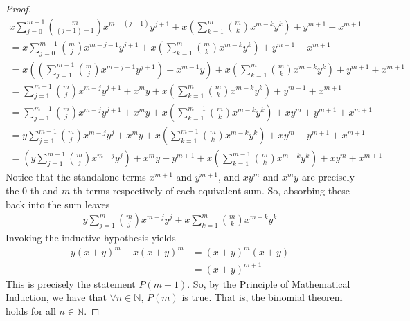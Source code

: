 \documentclass[11pt,reqno, tikz, border=3mm]{amsart}
\theoremstyle{plain}
\theoremstyle{definition}
\theoremstyle{remark}
\begin{document}
\begin{proof}
\begin{align}
x\sum^{m-1}_{j=0}\binom{m}{(j+1)-1}x^{m-(j+1)}y^{j+1} + x\left(\sum^m_{k=1}\binom{m}{k}x^{m-k}y^k\right) + y^{m+1} + x^{m+1} \\
=x\sum^{m-1}_{j=0}\binom{m}{j}x^{m-j-1}y^{j+1} + x\left(\sum^m_{k=1}\binom{m}{k}x^{m-k}y^k\right) + y^{m+1} + x^{m+1} \\
=x\left(\left( \sum^{m-1}_{j=1}\binom{m}{j}x^{m-j-1}y^{j+1}\right) + x^{m-1} y\right) + x\left(\sum^m_{k=1}\binom{m}{k}x^{m-k}y^k\right) + y^{m+1} + x^{m+1} \\
=\sum^{m-1}_{j=1} \binom{m}{j} x^{m-j}y^{j+1} + x^my + x\left(\sum^m_{k=1}\binom{m}{k}x^{m-k}y^k\right) + y^{m+1} + x^{m+1} \\
=\sum^{m-1}_{j=1} \binom{m}{j} x^{m-j}y^{j+1} + x^my + x\left(\sum^{m-1}_{k=1}\binom{m}{k}x^{m-k}y^k\right)+xy^m+y^{m+1}+x^{m+1} \\
=y\sum^{m-1}_{j=1} \binom{m}{j} x^{m-j}y^{j} + x^my + x\left(\sum^{m-1}_{k=1}\binom{m}{k}x^{m-k}y^k\right)+xy^m+y^{m+1}+x^{m+1} \\
=\left(y\sum^{m-1}_{j=1} \binom{m}{j} x^{m-j}y^{j}\right) + x^my + y^{m+1} + x\left(\sum^{m-1}_{k=1}\binom{m}{k}x^{m-k}y^k\right)+xy^m+x^{m+1}
\end{align}
Notice that the standalone terms $x^{m+1}$ and $y^{m+1}$, and $xy^m$ and $x^my$ are precisely the $0$-th and $m$-th terms respectively of each equivalent sum. So, absorbing these back into the sum leaves
\begin{align}
y\sum^m_{j=1} \binom{m}{j}x^{m-j}y^j + x\sum^{m}_{k=1}\binom{m}{k}x^{m-k}y^k
\end{align}
Invoking the inductive hypothesis yields
\begin{align}
y(x+y)^m + x(x+y)^m &= (x+y)^m(x+y) \\
&=(x+y)^{m+1}
\end{align}
This is precisely the statement $P(m+1)$. So, by the Principle of Mathematical Induction, we have that $\forall n \in \mathbb{N}$, $P(m)$ is true. That is, the binomial theorem holds for all $n \in \mathbb{N}$.

\end{proof}
\end{document}
